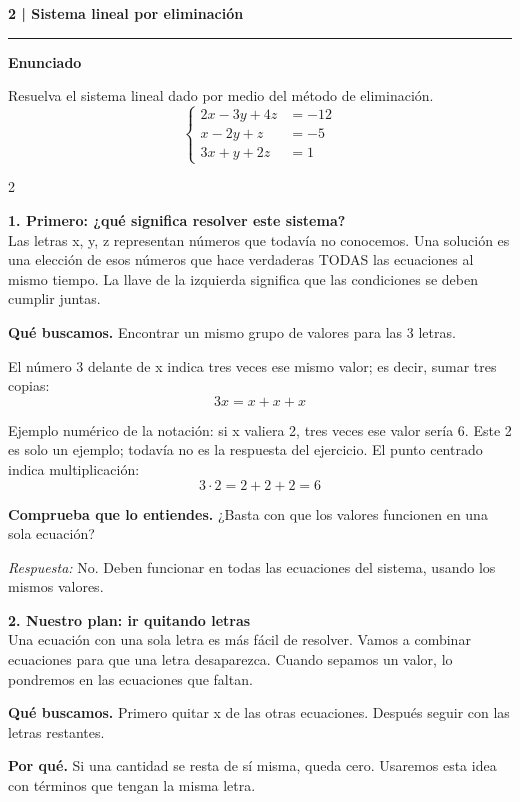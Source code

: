 \documentclass[11pt,a4paper,landscape]{article}
\newcommand{\titulo}[1]{{\LARGE\bfseries #1}\par\smallskip\hrule\medskip}
\begin{document}
\newpage{}\hypertarget{1.1-2}{}
\titulo{2 | Sistema lineal por eliminación}
\textbf{Enunciado}\par Resuelva el sistema lineal dado por medio del método de eliminación.
\[\left\{\begin{aligned}2x - 3y + 4z &= -12\\x - 2y + z &= -5\\3x + y + 2z &= 1\end{aligned}\right.\]
\begin{multicols*}{2}
\noindent\begin{minipage}{\linewidth}\textbf{1. Primero: ¿qué significa resolver este sistema?}\\[2pt]Las letras x, y, z representan números que todavía no conocemos. Una solución es una elección de esos números que hace verdaderas TODAS las ecuaciones al mismo tiempo. La llave de la izquierda significa que las condiciones se deben cumplir juntas.
\par\smallskip\textbf{Qué buscamos.} Encontrar un mismo grupo de valores para las 3 letras.
\par\smallskip El número 3 delante de x indica tres veces ese mismo valor; es decir, sumar tres copias:
\[3x=x+x+x\]
\par\smallskip Ejemplo numérico de la notación: si x valiera 2, tres veces ese valor sería 6. Este 2 es solo un ejemplo; todavía no es la respuesta del ejercicio. El punto centrado indica multiplicación:
\[3\cdot 2=2+2+2=6\]
\par\smallskip\textbf{Comprueba que lo entiendes.} ¿Basta con que los valores funcionen en una sola ecuación?\par\textit{Respuesta:} No. Deben funcionar en todas las ecuaciones del sistema, usando los mismos valores.
\end{minipage}\par\medskip
\noindent\begin{minipage}{\linewidth}\textbf{2. Nuestro plan: ir quitando letras}\\[2pt]Una ecuación con una sola letra es más fácil de resolver. Vamos a combinar ecuaciones para que una letra desaparezca. Cuando sepamos un valor, lo pondremos en las ecuaciones que faltan.
\par\smallskip\textbf{Qué buscamos.} Primero quitar x de las otras ecuaciones. Después seguir con las letras restantes.
\par\smallskip\textbf{Por qué.} Si una cantidad se resta de sí misma, queda cero. Usaremos esta idea con términos que tengan la misma letra.

\end{minipage}
\end{multicols*}
\end{document}

